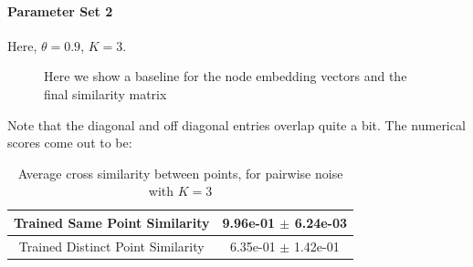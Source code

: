 \documentclass[a4paper]{article}
\begin{document}
\paragraph{Parameter Set 2}
Here, $\theta = 0.9$, $K = 3$.
\begin{figure}[H]
    \centering
    \caption{Here we show a baseline for the node embedding vectors and the final similarity matrix}
    \label{fig:pairwise3_plot}
\end{figure}
Note that the diagonal and off diagonal entries overlap quite a bit. The numerical scores come out to be:
\begin{table}[H]
    \centering
    \begin{tabular}{|c|c|} \hline
        Trained Same Point Similarity      & 9.96e-01 $\pm$ 6.24e-03  \\ \hline
        Trained Distinct Point Similarity  & 6.35e-01 $\pm$ 1.42e-01  \\ \hline
    \end{tabular}
    \caption{Average cross similarity between points, for pairwise noise with $K=3$}
    \label{tab:pairwise3_table}
\end{table}
\end{document}
